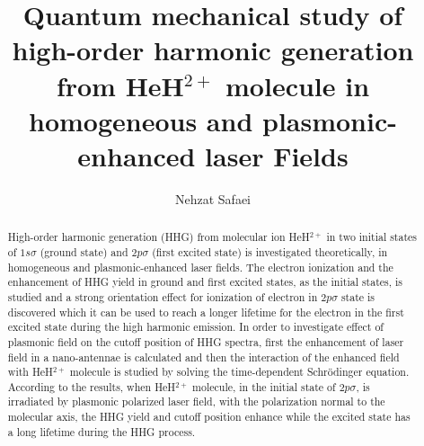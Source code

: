 \documentclass[%
reprint,
twocolumn,
 amsmath,amssymb,
 aps,
pra,
 showpacs
]{revtex4-1}
\begin{document}
\title{Quantum mechanical study of high-order harmonic generation from HeH$^{2+}$ molecule in homogeneous and plasmonic-enhanced laser Fields}


\author{Nehzat Safaei}





\begin{abstract}

High-order harmonic generation (HHG) from molecular ion HeH$^{2+}$ in two initial states of $1s\sigma$ (ground state) and $2p\sigma$ (first excited state) is investigated theoretically, in homogeneous and plasmonic-enhanced laser fields. The electron ionization and the enhancement of HHG yield in ground and first excited states, as the initial states, is studied and a strong orientation effect for ionization of electron in $2p\sigma$ state is discovered which it can be used to reach a longer lifetime for the electron in the first excited state during the high harmonic emission. In order to investigate effect of plasmonic field on the cutoff position of HHG spectra, first the enhancement of laser field in a nano-antennae is calculated and then the interaction of the enhanced field with HeH$^{2+}$ molecule is studied by solving the time-dependent Schr\"{o}dinger equation. According to the results, when HeH$^{2+}$ molecule, in the initial state of $2p\sigma$, is irradiated by plasmonic polarized laser field, with the polarization normal to the molecular axis, the HHG yield and cutoff position enhance while the excited state has a long lifetime during the HHG process. 
\end{abstract}
\maketitle
\end{document}
